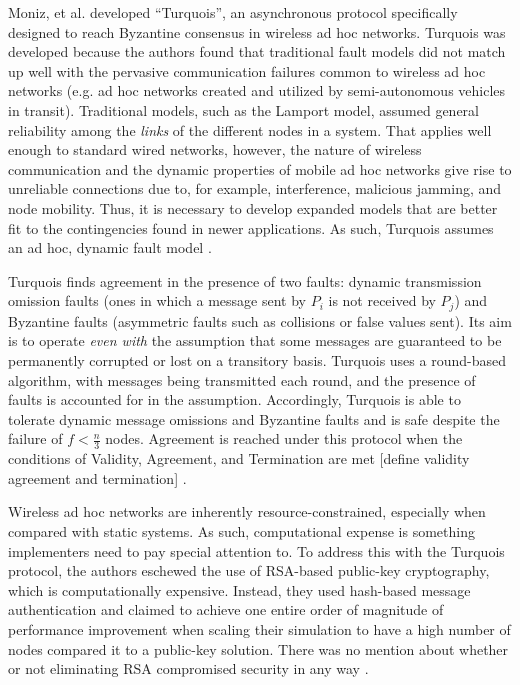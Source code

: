 \documentclass[twoside, conference]{IEEEtran}
\begin{document}
Moniz, et al. developed ``Turquois'', an asynchronous protocol specifically designed to reach Byzantine consensus in wireless ad hoc networks. Turquois was developed because the authors found that traditional fault models did not match up well with the pervasive communication failures common to wireless ad hoc networks (e.g. ad hoc networks created and utilized by semi-autonomous vehicles in transit). Traditional models, such as the Lamport model, assumed general reliability among the \textit{links} of the different nodes in a system. That applies well enough to standard wired networks, however, the nature of wireless communication and the dynamic properties of mobile ad hoc networks give rise to unreliable connections due to, for example, interference, malicious jamming, and node mobility. Thus, it is necessary to develop expanded models that are better fit to the contingencies found in newer applications. As such, Turquois assumes an ad hoc, dynamic fault model \cite{Moniz2013}.

Turquois finds agreement in the presence of two faults: dynamic transmission omission faults (ones in which a message sent by $P_i$ is not received by $P_j$) and Byzantine faults (asymmetric faults such as collisions or false values sent). Its aim is to operate \textit{even with} the assumption that some messages are guaranteed to be permanently corrupted or lost on a transitory basis. Turquois uses a  round-based algorithm, with messages being transmitted each round, and the presence of faults is accounted for in the assumption. Accordingly, Turquois is able to tolerate dynamic message omissions and Byzantine faults and is safe despite the failure of $f < \frac{n}{3}$ nodes. Agreement is reached under this protocol when the conditions of Validity, Agreement, and Termination are met [define validity agreement and termination] \cite{Moniz2013}.

Wireless ad hoc networks are inherently resource-constrained, especially when compared with static systems. As such, computational expense is something implementers need to pay special attention to. To address this with the Turquois protocol, the authors eschewed the use of RSA-based public-key cryptography, which is computationally expensive. Instead, they used hash-based message authentication and claimed to achieve one entire order of magnitude of performance improvement when scaling their simulation to have a high number of nodes compared it to a public-key solution. There was no mention about whether or not eliminating RSA compromised security in any way \cite{Moniz2013}.
\end{document}
